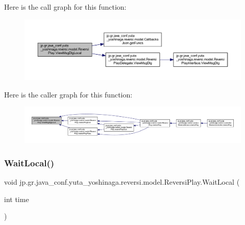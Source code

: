 Here is the call graph for this function\+:
\nopagebreak
\begin{figure}[H]
\begin{center}
\leavevmode
\includegraphics[width=350pt]{classjp_1_1gr_1_1java__conf_1_1yuta__yoshinaga_1_1reversi_1_1model_1_1_reversi_play_ae673231f92f3bd36a43acbc713a97513_cgraph}
\end{center}
\end{figure}
Here is the caller graph for this function\+:
\nopagebreak
\begin{figure}[H]
\begin{center}
\leavevmode
\includegraphics[width=350pt]{classjp_1_1gr_1_1java__conf_1_1yuta__yoshinaga_1_1reversi_1_1model_1_1_reversi_play_ae673231f92f3bd36a43acbc713a97513_icgraph}
\end{center}
\end{figure}
\mbox{\label{classjp_1_1gr_1_1java__conf_1_1yuta__yoshinaga_1_1reversi_1_1model_1_1_reversi_play_aec398cf0d2ac7bd1d1b64be67bcadde2}} 
\subsubsection{\texorpdfstring{Wait\+Local()}{WaitLocal()}}
{\footnotesize\ttfamily void jp.\+gr.\+java\+\_\+conf.\+yuta\+\_\+yoshinaga.\+reversi.\+model.\+Reversi\+Play.\+Wait\+Local (\begin{DoxyParamCaption}\item[{int}]{time }\end{DoxyParamCaption})\hspace{0.3cm}{\ttfamily [private]}}



